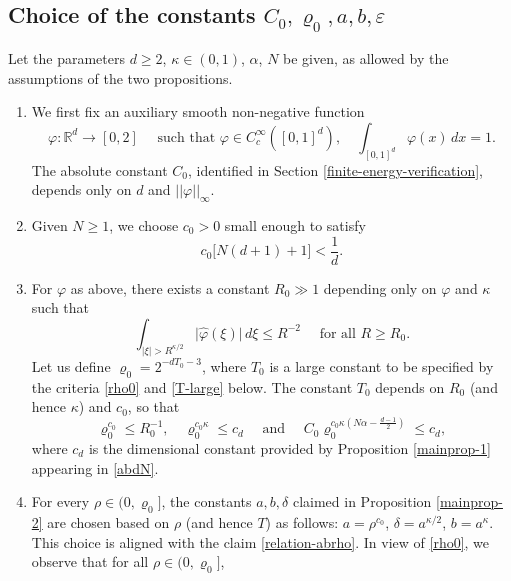 \documentclass[a4paper,11pt]{amsart}
\numberwithin{equation}{section}
\begin{document}
\subsection{Choice of the constants $C_0, \varrho_0, a, b, \varepsilon$} \label{parameter-selection-section} 
Let the parameters $d \geq 2$, $\kappa \in (0,1)$, $\alpha$, $N$ be given, as allowed by the assumptions of the two propositions. 
\begin{enumerate}[1.] 
\item We first fix an auxiliary smooth non-negative function 
\begin{equation} \label{conditions-phi} 
\varphi: \mathbb R^d \rightarrow [0, 2] \quad \text{ such that } \varphi \in C_c^{\infty}([0,1]^d), \quad \int_{[0,1]^d} \varphi(x) \, dx = 1. 
\end{equation} 
The absolute constant $C_0$, identified in Section \ref{finite-energy-verification}, depends only on $d$ and $||\varphi||_{\infty}$. 
\vskip0.1in
\item Given $N \geq 1$, we choose $c_0 > 0$ small enough to satisfy 
\begin{equation} \label{what-is-c0}
c_0 \bigl[N(d+1) + 1 \bigr] < \frac{1}{d}.
\end{equation}  
\item For $\varphi$ as above, there exists a constant $R_0 \gg 1$ depending only on $\varphi$ and $\kappa$ such that 
\begin{equation} \label{tail-phi} 
\int_{|\xi| > R^{\kappa/2}} \bigl| \widehat{\varphi}(\xi) \bigr|\, d\xi \leq R^{-2} \quad \text{ for all } R \geq R_0. 
\end{equation} 
Let us define $\varrho_0 = 2^{-dT_0-3}$, where $T_0$ is a large constant to be specified by the criteria \eqref{rho0} and \eqref{T-large} below. The constant $T_0$ depends on $R_0$ (and hence $\kappa$) and $c_0$, so that 
\begin{equation} \label{rho0}
\varrho_0^{c_0} \leq R_0^{-1}, \quad \varrho_0^{c_0 \kappa} \leq c_d \quad \text{ and } \quad C_0 \varrho_0^{c_0 \kappa (N \alpha - \frac{d-1}{2})} \leq c_d, 
\end{equation}  
where $c_d$ is the dimensional constant provided by Proposition \ref{mainprop-1} appearing in \eqref{abdN}. 
\vskip0.1in
\item For every $\rho \in (0, \varrho_0]$, the constants $a, b, \delta$ claimed in Proposition \ref{mainprop-2} are chosen based on $\rho$ (and hence $T$) as follows: $a = \rho^{c_0}$, $\delta = a^{\kappa/2}$, $b = a^{\kappa}$. This choice is aligned with the claim \eqref{relation-abrho}.  In view of \eqref{rho0}, we observe that for all $\rho \in (0, \varrho_0]$,

\end{enumerate}
\end{document}
